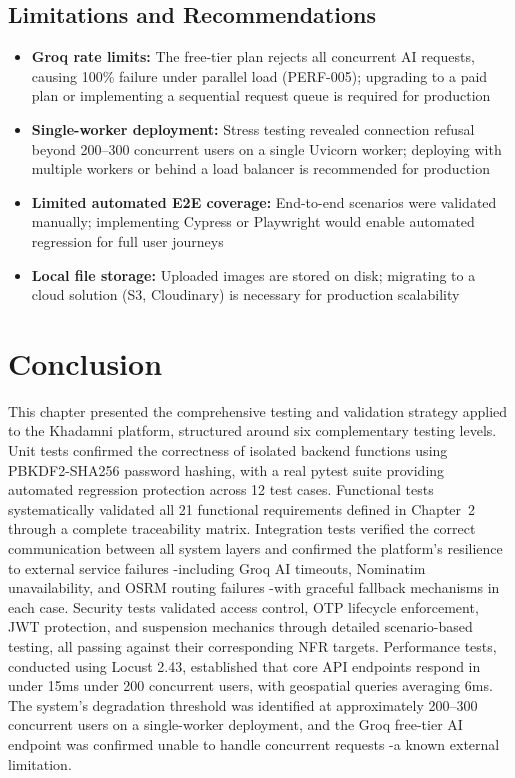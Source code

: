 \subsection{Limitations and Recommendations}

\begin{itemize}[noitemsep]
    \item \textbf{Groq rate limits:} The free-tier plan rejects all concurrent AI requests, causing 100\% failure under parallel load (PERF-005); upgrading to a paid plan or implementing a sequential request queue is required for production
    \item \textbf{Single-worker deployment:} Stress testing revealed connection refusal beyond 200--300 concurrent users on a single Uvicorn worker; deploying with multiple workers or behind a load balancer is recommended for production
    \item \textbf{Limited automated E2E coverage:} End-to-end scenarios were validated manually; implementing Cypress or Playwright would enable automated regression for full user journeys
    \item \textbf{Local file storage:} Uploaded images are stored on disk; migrating to a cloud solution (S3, Cloudinary) is necessary for production scalability
\end{itemize}

\section{Conclusion}

This chapter presented the comprehensive testing and validation strategy applied to the Khadamni platform, structured around six complementary testing levels. Unit tests confirmed the correctness of isolated backend functions using PBKDF2-SHA256 password hashing, with a real pytest suite providing automated regression protection across 12 test cases. Functional tests systematically validated all 21 functional requirements defined in Chapter~2 through a complete traceability matrix. Integration tests verified the correct communication between all system layers and confirmed the platform's resilience to external service failures -including Groq AI timeouts, Nominatim unavailability, and OSRM routing failures -with graceful fallback mechanisms in each case. Security tests validated access control, OTP lifecycle enforcement, JWT protection, and suspension mechanics through detailed scenario-based testing, all passing against their corresponding NFR targets. Performance tests, conducted using Locust 2.43, established that core API endpoints respond in under 15ms under 200 concurrent users, with geospatial queries averaging 6ms. The system's degradation threshold was identified at approximately 200--300 concurrent users on a single-worker deployment, and the Groq free-tier AI endpoint was confirmed unable to handle concurrent requests -a known external limitation.

